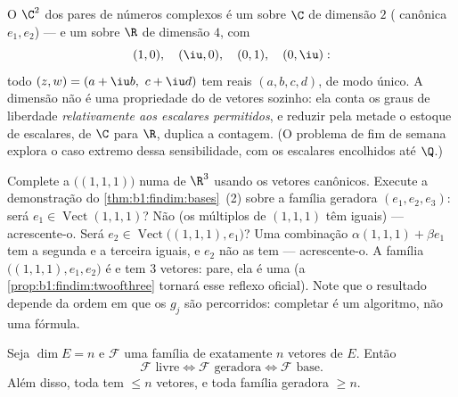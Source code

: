 \begin{example}
\label{ex:b1:findim:twodimensions}
O  $\C^2$ dos pares de números complexos é um  sobre $\C$ de dimensão $2$ ( canônica $e_1, e_2$) --- e um
 sobre $\R$ de dimensão $4$, com 
\[
(1, 0),\quad (\iu, 0),\quad (0, 1),\quad (0, \iu):
\]
todo $(z, w) = (a + \iu b,\ c + \iu d)$ tem  reais $(a, b, c, d)$, de modo único. A dimensão
não é uma propriedade do  de vetores sozinho: ela conta os
graus de liberdade \emph{relativamente aos escalares permitidos}, e
reduzir pela metade o estoque de escalares, de $\C$ para $\R$,
duplica a contagem. (O problema de fim de semana explora o caso
extremo dessa sensibilidade, com os escalares encolhidos até $\Q$.)
\end{example}

\begin{example}
\label{ex:b1:findim:completion}
Complete a  $\bigl((1,1,1)\bigr)$ numa  de $\R^3$ usando os
vetores canônicos. Execute a demonstração do \cref{thm:b1:findim:bases}~(2) sobre a
família geradora $(e_1,
e_2, e_3)$: será $e_1 \in \operatorname{Vect}(1,1,1)$? Não (os múltiplos de $(1,1,1)$
têm  iguais) --- acrescente-o. Será $e_2 \in
\operatorname{Vect}\bigl((1,1,1), e_1\bigr)$? Uma
combinação $\alpha(1,1,1) + \beta e_1$ tem a segunda e a terceira  iguais, e
$e_2$ não as tem --- acrescente-o. A família $\bigl((1,1,1), e_1, e_2\bigr)$ é  e tem
$3$ vetores: pare, ela é uma  (a \cref{prop:b1:findim:twoofthree} tornará esse reflexo
oficial). Note que o resultado depende da ordem em que os $g_j$ são
percorridos: completar é um algoritmo, não uma fórmula.
\end{example}

\begin{proposition}\label{prop:b1:findim:twoofthree}
Seja $\dim E = n$ e $\mathcal{F}$ uma família de exatamente $n$ vetores
de $E$. Então
\[
\mathcal{F} \text{ livre} \iff \mathcal{F} \text{ geradora} \iff
\mathcal{F} \text{ base}.
\]
Além disso, toda  tem $\leq n$ vetores, e toda família
geradora $\geq n$.
\end{proposition}

